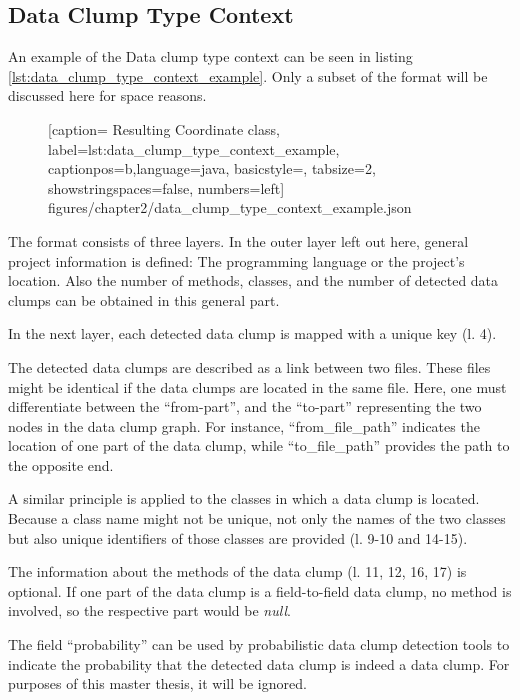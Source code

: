 
\renewcommand\appendixpagename{Appendix}
\begin{appendices}
\chapter{Data Clump Type Context}
\label{app:data_clump_format}
An example of the Data clump type context can be seen in listing \ref{lst:data_clump_type_context_example}. Only a subset of the format will be discussed here for space reasons.

  \begin{figure} [htbp!]
			
			[caption={ Resulting Coordinate class},
			label={lst:data_clump_type_context_example},
			captionpos=b,language=java, basicstyle=\footnotesize, tabsize=2, showstringspaces=false,  numbers=left]
			{figures/chapter2/data_clump_type_context_example.json}
		\end{figure}

The format consists of three layers. In the outer layer left out here, general project information is defined: The programming language or the project's location. Also the number of methods, classes, and the number of detected data clumps can be obtained in this general part. 

In the next layer, each detected data clump is mapped with a unique key (l. 4).

The detected data clumps are described as a link between two files. These files might be identical if the data clumps are located in the same file. Here, one must differentiate between the \enquote{from-part}, and the \enquote{to-part} representing the two nodes in the data clump graph. For instance, \enquote{from\_file\_path} indicates the location of one part of the data clump, while \enquote{to\_file\_path} provides the path to the opposite end. 

A similar principle is applied to the classes in which a data clump is located. Because a class name might not be unique, not only the names of the two classes but also unique identifiers of those classes are provided (l. 9-10 and 14-15).

The information about the methods of the data clump (l. 11, 12, 16, 17) is optional. If one part of the data clump is a field-to-field data clump, no method is involved, so the respective part would be \textit{null}.

The field \enquote{probability} can be used by probabilistic data clump detection tools to indicate the probability that the detected data clump is indeed a data clump. For purposes of this master thesis, it will be ignored. 


\end{appendices}
